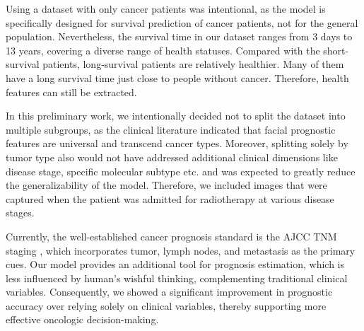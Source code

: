 \documentclass[runningheads]{llncs}
\begin{document}
Using a dataset with only cancer patients was intentional, as the model is specifically designed for survival prediction of cancer patients, not for the general population. Nevertheless, the survival time in our dataset ranges from 3 days to 13 years, covering a diverse range of health statuses. Compared with the short-survival patients, long-survival patients are relatively healthier. Many of them have a long survival time just close to people without cancer. Therefore, health features can still be extracted.

In this preliminary work, we intentionally decided not to split the dataset into multiple subgroups, as the clinical literature indicated that facial prognostic features are universal and transcend cancer types. Moreover, splitting solely by tumor type also would not have addressed additional clinical dimensions like disease stage, specific molecular subtype etc. and was expected to greatly reduce the generalizability of the model. Therefore, we included images that were captured when the patient was admitted for radiotherapy at various disease stages.


Currently, the well-established cancer prognosis standard is the AJCC TNM staging \cite{amin2017eighth}, which incorporates tumor, lymph nodes, and metastasis as the primary cues. Our model provides an additional tool for prognosis estimation, which is less influenced by human’s wishful thinking, complementing traditional clinical variables. Consequently, we showed a significant improvement in prognostic accuracy over relying solely on clinical variables, thereby supporting more effective oncologic decision-making.
\end{document}
